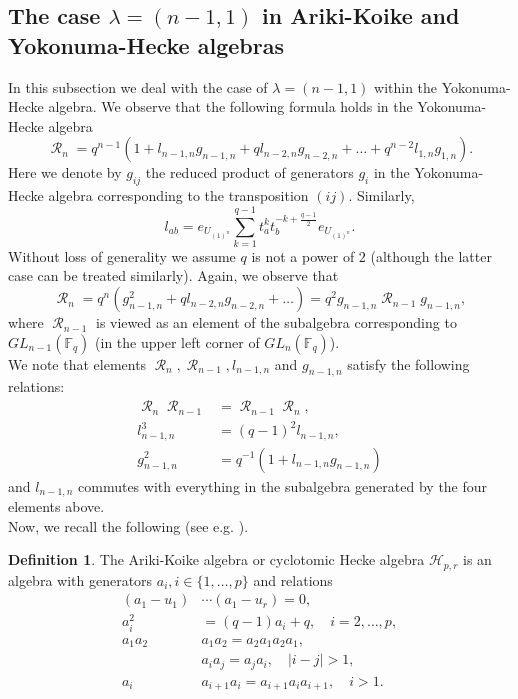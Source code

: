 \documentclass[12pt,reqno]{amsart}
\theoremstyle{definition}
\newtheorem{defn}[thm]{Definition}
\theoremstyle{remark}
\numberwithin{equation}{section}
\newcommand{\GL}[1]{GL_{#1}(\mathbb{F}_q)}
\DeclareMathOperator{\R}{\mathcal{R}}
\begin{document}
\subsection{The case $\lambda=(n-1,1)$ in Ariki-Koike and Yokonuma-Hecke algebras}
In this subsection we deal with the case of $\lambda=(n-1,1)$ within the Yokonuma-Hecke algebra. We observe that the following formula holds in the Yokonuma-Hecke algebra
\[
\R_n = q^{n-1}(1+l_{n-1,n}g_{n-1,n}+ql_{n-2,n}g_{n-2,n}+\dots+ q^{n-2}l_{1,n}g_{1,n}).
\]
Here we denote by $g_{ij}$ the reduced product of generators $g_i$ in the Yokonuma-Hecke algebra corresponding to the transposition $(ij)$. Similarly,
\[
l_{ab}= e_{U_{(1)^n}}\sum_{k=1}^{q-1}t_a^{k}t_{b}^{-k+\frac{q-1}{2}} e_{U_{(1)^n}}.
\]
Without loss of generality we assume $q$ is not a power of $2$ (although the latter case can be treated similarly). Again, we observe that
\[
\R_n = q^n(g_{n-1,n}^2+ ql_{n-2,n}g_{n-2,n}+\dots)=q^2 g_{n-1,n} \R_{n-1} g_{n-1,n},
\]
where $\R_{n-1}$ is viewed as an element of the subalgebra corresponding to $\GL{n-1}$ (in the upper left corner of $\GL{n}$).\\

We note that elements $\R_n,\R_{n-1},l_{n-1,n}$ and $g_{n-1,n}$ satisfy the following relations:
\begin{align*}
    \R_n\R_{n-1}&=\R_{n-1}\R_n,\\
    l_{n-1,n}^3&=(q-1)^2l_{n-1,n},\\
    g_{n-1,n}^2&=q^{-1}(1+l_{n-1,n} g_{n-1,n})
\end{align*}
and $l_{n-1,n}$ commutes with everything in the subalgebra generated by the four elements above.\\


Now, we recall the following (see e.g. \cite{AK}).

\begin{defn}\label{Ariki-Koike_algebra}
    The Ariki-Koike algebra or cyclotomic Hecke algebra $\mathcal{H}_{p,r}$ is an algebra with generators $a_i, i\in \{1,\dots,p\}$ and relations
\begin{align}
    (a_1-u_1)&\cdots (a_1-u_r)=0,\\
    a_i^{2}&=(q-1)a_i+q, \quad i=2,\dots,p,\\
    a_1a_2&a_1a_2=a_2a_1a_2a_1,\\
    &a_ia_j=a_ja_i, \quad |i-j|>1,\\
    a_i &a_{i+1}a_i=a_{i+1}a_ia_{i+1}, \quad i>1.
\end{align}    
\end{defn}
\end{document}

